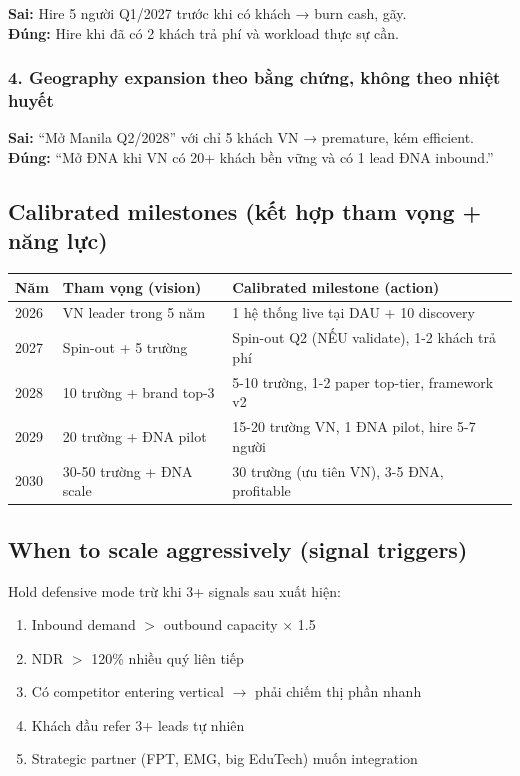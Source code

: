 \documentclass[11pt,a4paper]{article}
\begin{document}
\textbf{Sai:} Hire 5 người Q1/2027 trước khi có khách → burn cash, gãy.\\
\textbf{Đúng:} Hire khi đã có 2 khách trả phí và workload thực sự cần.

\subsubsection*{4. Geography expansion theo bằng chứng, không theo nhiệt huyết}

\textbf{Sai:} ``Mở Manila Q2/2028'' với chỉ 5 khách VN → premature, kém efficient.\\
\textbf{Đúng:} ``Mở ĐNA khi VN có 20+ khách bền vững và có 1 lead ĐNA inbound.''

\subsection{Calibrated milestones (kết hợp tham vọng + năng lực)}

\begin{tabularx}{\linewidth}{@{}p{1.5cm} X X@{}}
\toprule
\textbf{Năm} & \textbf{Tham vọng (vision)} & \textbf{Calibrated milestone (action)} \\
\midrule
2026 & VN leader trong 5 năm & 1 hệ thống live tại DAU + 10 discovery \\
2027 & Spin-out + 5 trường & Spin-out Q2 (NẾU validate), 1-2 khách trả phí \\
2028 & 10 trường + brand top-3 & 5-10 trường, 1-2 paper top-tier, framework v2 \\
2029 & 20 trường + ĐNA pilot & 15-20 trường VN, 1 ĐNA pilot, hire 5-7 người \\
2030 & 30-50 trường + ĐNA scale & 30 trường (ưu tiên VN), 3-5 ĐNA, profitable \\
\bottomrule
\end{tabularx}

\subsection{When to scale aggressively (signal triggers)}

Hold defensive mode trừ khi 3+ signals sau xuất hiện:

\begin{enumerate}
\item Inbound demand $>$ outbound capacity $\times$ 1.5
\item NDR $>$ 120\% nhiều quý liên tiếp
\item Có competitor entering vertical $\to$ phải chiếm thị phần nhanh
\item Khách đầu refer 3+ leads tự nhiên
\item Strategic partner (FPT, EMG, big EduTech) muốn integration
\end{enumerate}
\end{document}
